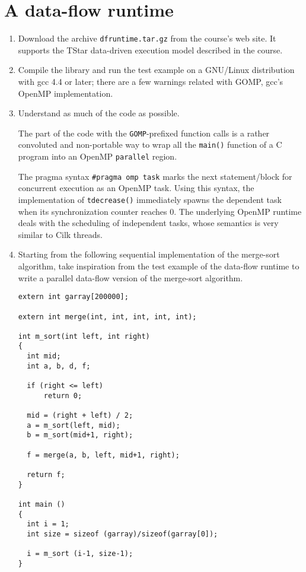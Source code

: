 \documentclass[a4paper]{article}
\begin{document}
\section{A data-flow runtime}

\begin{enumerate}
\item Download the archive \texttt{dfruntime.tar.gz} from the course's
  web site.  It supports the TStar data-driven execution model
  described in the course.

\item Compile the library and run the test example on a GNU/Linux
  distribution with gcc 4.4 or later; there are a few warnings related
  with GOMP, gcc's OpenMP implementation.

\item Understand as much of the code as possible.
  
  The part of the code with the \texttt{GOMP}-prefixed function calls
  is a rather convoluted and non-portable way to wrap all the
  \texttt{main()} function of a C program into an OpenMP
  \texttt{parallel} region.

  The pragma syntax \texttt{\#pragma omp task} marks the next
  statement/block for concurrent execution as an OpenMP task. Using
  this syntax, the implementation of \texttt{tdecrease()} immediately
  spawns the dependent task when its synchronization counter reaches
  0.  The underlying OpenMP runtime deals with the scheduling of
  independent tasks, whose semantics is very similar to Cilk threads.

\item Starting from the following sequential implementation of the
  merge-sort algorithm, take inspiration from the test example of the
  data-flow runtime to write a parallel data-flow version of the
  merge-sort algorithm.

\begin{verbatim}
extern int garray[200000];

extern int merge(int, int, int, int, int);

int m_sort(int left, int right)
{
  int mid;
  int a, b, d, f;

  if (right <= left)
      return 0;

  mid = (right + left) / 2;
  a = m_sort(left, mid);
  b = m_sort(mid+1, right);

  f = merge(a, b, left, mid+1, right);

  return f;
}

int main ()
{
  int i = 1;
  int size = sizeof (garray)/sizeof(garray[0]);

  i = m_sort (i-1, size-1);
}
\end{verbatim}

\end{enumerate}
\end{document}
